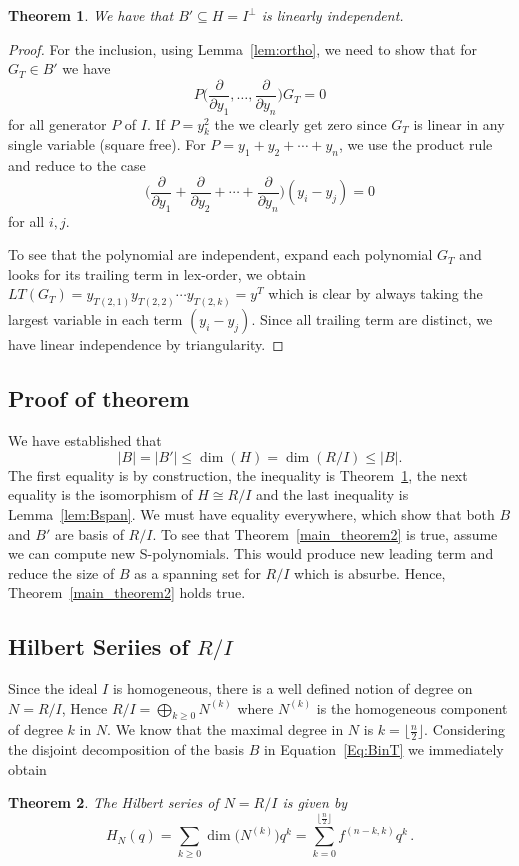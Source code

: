 \documentclass[12pt,reqno]{amsart}
\theoremstyle{plain}
\newtheorem{theorem}{Theorem}[section]
\theoremstyle{definition}
\begin{document}
\begin{theorem}\label{thm:indB}
 We have that $B'\subseteq H=I^\perp$ is linearly independent.
\end{theorem}
\begin{proof}
 For the inclusion, using Lemma~\ref{lem:ortho}, we need to show that for $G_T\in B'$ we have
   $$P\big({\textstyle \frac{ \partial}{ \partial y_1},\ldots,\frac{ \partial}{ \partial y_n}}\big) G_T =0 $$
   for all generator $P$ of $I$. If $P=y_k^2$ the we clearly get zero since $G_T$ is linear in any single variable (square free).
   For $P=y_1+y_2+\cdots+y_n$, we use the product rule and reduce to the case
   $$\big({\textstyle \frac{ \partial}{ \partial y_1}+ \frac{ \partial}{ \partial y_2}+\cdots+\frac{ \partial}{ \partial y_n}}\big) (y_i-y_j)=0$$
   for all $i,j$.
  
  To see that the  polynomial are independent, expand each polynomial $G_T$ and looks for its trailing term in  lex-order, we obtain $LT(G_T)=y_{T(2,1)}   y_{T(2,2)} \cdots  y_{T(2,k)}  = y^T$
which  is clear by always taking the largest variable in each term $(y_i-y_j)$. Since all trailing term are distinct, we have  linear independence by  triangularity.
\end{proof}

\subsection{Proof of theorem}\label{ss:proofthm}
We have established that
 $$|B|=|B'|\le \dim(H) =\dim(R/I)\le |B|.$$
 The first equality is by construction, the inequality is Theorem~\ref{thm:indB}, the next equality is the isomorphism of $H\cong R/I$ and the last inequality is 
 Lemma~\ref{lem:Bspan}. We must have equality everywhere, which show that both $B$ and $B'$ are basis of $R/I$. To see that Theorem~\ref{main_theorem2}
 is true, assume we can compute new S-polynomials. This would produce new leading term and reduce the size of $B$ as a spanning set for $R/I$ which is absurbe.
 Hence,  Theorem~\ref{main_theorem2} holds true.

\subsection{Hilbert  Seriies of $R/I$}\label{ss:hilbert}
Since the ideal $I$ is homogeneous, there is a well defined notion of degree on $N=R/I$, Hence $R/I=\bigoplus_{k\ge 0} N^{(k)}$ 
where $N^{(k)}$ is the homogeneous component of degree $k$ in $N$. We know that the maximal degree in $N$ is $k= \lfloor \frac{n}{2} \rfloor$.
Considering the disjoint decomposition of the basis $B$ in  Equation~\ref{Eq:BinT} we immediately obtain
\begin{theorem}\label{thm:hlbert}
 The Hilbert series of $N=R/I$ is given by
 $$ H_N(q) = \sum_{k\ge 0} \dim\big( N^{(k)}\big) q^k = \sum_{k=0}^{ \lfloor \frac{n}{2} \rfloor} f^{(n-k,k)} q^k\,.
 $$
\end{theorem}
\end{document}
